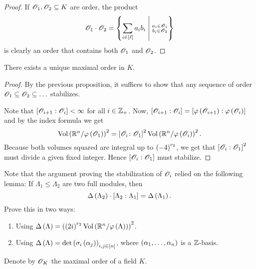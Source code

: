 \documentclass[11pt]{article}
\begin{document}
\begin{proof}
If $\mathcal{O}_1, \mathcal{O}_2 \subseteq K$ are order, the product
\[\mcal{O}_1 \cdot \mcal{O}_2 = \set{\sum_{i \in [\ell]} a_i b_i}{\substack{a_i \in \mcal{O}_1 \\ b_i \in \mcal{O}_2}}\]
is clearly an order that contains both $\mathcal{O}_1$ and $\mathcal{O}_2$.
\end{proof}

\begin{theorem}
There exists a unique maximal order in $K$.
\end{theorem}

\begin{proof}
By the previous proposition, it suffices to show that any sequence of order $\mathcal{O}_1 \subseteq \mathcal{O}_2 \subseteq \ldots$ stabilizes.

Note that $\left[ \mathcal{O}_{i+1} : \mathcal{O}_{i} \right] < \infty$ for all $i \in \mathbb{Z}_+$. Now, $\left[ \mathcal{O}_{i+1} : \mathcal{O}_i \right] = \left[ \varphi\left( \mathcal{O}_{i+1} \right) : \varphi\left( \mathcal{O}_i \right) \right]$ and by the index formula we get
\[\mathrm{Vol}\left( \mathbb{R}^n / \varphi\left( \mathcal{O}_1 \right) \right)^2 = \left[ \mathcal{O}_i \colon \mathcal{O}_1 \right]^2 \mathrm{Vol}\left( \mathbb{R}^n / \varphi\left( \mathcal{O}_i \right) \right)^2 \text{.} \]
Because both volumes squared are integral up to $\left( -4 \right)^{r_2}$, we get that $\left[ \mathcal{O}_i : \mathcal{O}_1 \right]^2$ must divide a given fixed integer. Hence $\left[ \mathcal{O}_i : \mathcal{O}_1 \right]$ must stabilize.
\end{proof}

\begin{exercise}
Note that the argument proving the stabilization of $\mathcal{O}_i$ relied on the following lemma:
If $\Lambda_1 \leq \Lambda_2$ are two full modules, then \[\Delta\left( \Lambda_2 \right) \cdot \left[ \Lambda_2 : \Lambda_1 \right] = \Delta\left( \Lambda_1 \right)\text{.}\]
Prove this in two ways:
\begin{enumerate}
\item Using $\Delta\left( \Lambda \right) = \left( \left( 2i \right)^{r_2} \mathrm{Vol}\left( \mathbb{R}^n / \varphi\left( \Lambda \right) \right) \right)^2$.
\item Using $\Delta\left( \Lambda \right) = \det\left( \sigma_i\left( \alpha_j \right) \right)_{i,j \in [n]}$, where $\left( \alpha_1, \ldots, \alpha_n \right)$ is a $\mathbb{Z}$-basis.
\end{enumerate}
\end{exercise}


\begin{notation}
Denote by $\mathcal{O}_K$ the maximal order of a field $K$.
\end{notation}
\end{document}
